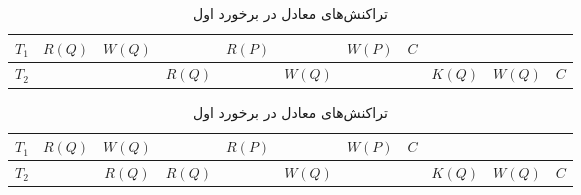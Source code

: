 \documentclass[20pt, a4paper]{article}
\begin{document}
\begin{LTR}
    \begin{table}[h]
        \centering
        \begin{RTL}
            \caption{تراکنش‌های معادل در برخورد اول}
        \end{RTL}
        \begin{tabular}{|c|c|c|c|c|c|c|c|c|c|c|}
            \hline
            $T_{1}$ & $R(Q)$ & $W(Q)$ & & $R(P)$ & & $W(P)$ & $C$ & & & \\ \hline
            $T_{2}$ & & & $R(Q)$ & & $W(Q)$ & &  & $K(Q)$ & $W(Q)$ & $C$ \\ \hline
        \end{tabular}
    \end{table}
\end{LTR}


\begin{LTR}
    \begin{table}[h]
        \centering
        \begin{RTL}
            \caption{تراکنش‌های معادل در برخورد اول}
        \end{RTL}
        \begin{tabular}{|c|c|c|c|c|c|c|c|c|c|c|}
            \hline
            $T_{1}$ & $R(Q)$ & $W(Q)$ & & $R(P)$ & & $W(P)$ & $C$ & & & \\ \hline
            $T_{2}$ & & $R(Q)$ & $R(Q)$ & & $W(Q)$ & &  & $K(Q)$ & $W(Q)$ & $C$ \\ \hline
        \end{tabular}
    \end{table}
\end{LTR}
\end{document}
